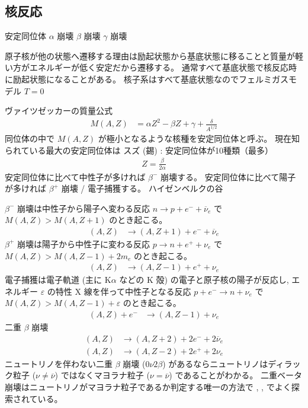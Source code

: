 \documentclass[uplatex,dvipdfmx,a4paper,11pt]{jlreq}
\numberwithin{equation}{section}
\theoremstyle{definition}
\begin{document}
\subsection{核反応}
安定同位体
$\alpha$ 崩壊
$\beta$ 崩壊
$\gamma$ 崩壊


原子核が他の状態へ遷移する理由は励起状態から基底状態に移ることと質量が軽い方がエネルギーが低く安定だから遷移する。
通常すべて基底状態で核反応時に励起状態になることがある。
核子系はすべて基底状態なのでフェルミガスモデル $T = 0$

ヴァイツゼッカーの質量公式
\begin{align}
  M(A, Z) & = \alpha Z^2 - \beta Z + \gamma + \frac{\delta}{A^{1/2}}
\end{align}
同位体の中で $M(A, Z)$ が極小となるような核種を安定同位体と呼ぶ。
現在知られている最大の安定同位体は 
スズ (錫) : 安定同位体が10種類（最多）
\begin{align}
  Z = \frac{\beta}{2\alpha}
\end{align}
安定同位体に比べて中性子が多ければ $\beta^-$ 崩壊する。
安定同位体に比べて陽子が多ければ $\beta^+$ 崩壊 / 電子捕獲する。
ハイゼンベルクの谷

$\beta^-$ 崩壊は中性子から陽子へ変わる反応 $n \to p + e^- + \overline{\nu}_e$ で $M(A, Z) > M(A, Z + 1)$ のとき起こる。
\begin{align}
  (A, Z) & \to (A, Z + 1) + e^- + \overline{\nu}_e
\end{align}
$\beta^+$ 崩壊は陽子から中性子に変わる反応 $p \to n + e^+ + \nu_e$ で $M(A, Z) > M(A, Z - 1) + 2m_e$ のとき起こる。
\begin{align}
  (A, Z) & \to (A, Z - 1) + e^+ + \nu_e
\end{align}
電子捕獲は電子軌道 (主に K$\alpha$ などの K 殻) の電子と原子核の陽子が反応し, エネルギー $\varepsilon$ の特性 X 線を伴って中性子となる反応 $p + e^- \to n + \nu_e$ で $M(A, Z) > M(A, Z - 1) + \varepsilon$ のとき起こる。
\begin{align}
  (A, Z) + e^- & \to (A, Z - 1) + \nu_e
\end{align}
二重 $\beta$ 崩壊
\begin{align}
  (A, Z) & \to (A, Z + 2) + 2e^- + 2\overline{\nu}_e \\
  (A, Z) & \to (A, Z - 2) + 2e^+ + 2\nu_e
\end{align}
ニュートリノを伴わない二重 $\beta$ 崩壊 ($0\nu2\beta$) があるならニュートリノはディラック粒子 ($\nu \neq \overline{\nu}$) ではなくマヨラナ粒子 ($\nu = \overline{\nu}$) であることがわかる。
⼆重ベータ崩壊はニュートリノがマヨラナ粒子であるか判定する唯⼀の⽅法で , ,  でよく探索されている。
\end{document}
